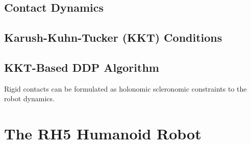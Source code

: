 \subsection{Contact Dynamics}
\subsection{Karush-Kuhn-Tucker (KKT) Conditions}
\subsection{KKT-Based DDP Algorithm}
Rigid contacts can be formulated as holonomic scleronomic constraints to the robot dynamics. 

\section{The RH5 Humanoid Robot}












